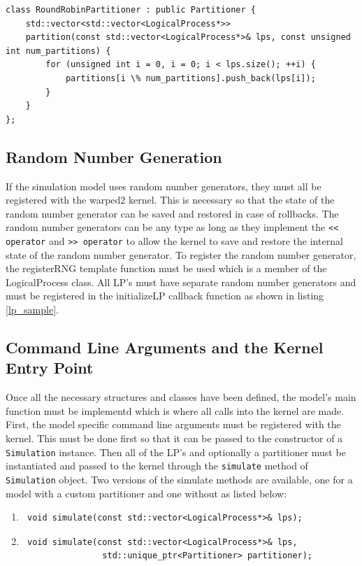 \documentclass[11pt]{book}
\begin{document}
\begin{lstlisting}[caption=Sample \textsc{warped2} Partitioner Definition, label=partitioner_sample, float]
class RoundRobinPartitioner : public Partitioner {
    std::vector<std::vector<LogicalProcess*>>
    partition(const std::vector<LogicalProcess*>& lps, const unsigned int num_partitions) {
        for (unsigned int i = 0, i = 0; i < lps.size(); ++i) {
            partitions[i \% num_partitions].push_back(lps[i]);
        }
    }
};
\end{lstlisting}

\subsection{Random Number Generation}

If the simulation model uses random number generators, they must all be registered with the warped2
kernel. This is necessary so that the state of the random number generator can be saved and restored
in case of rollbacks. The random number generators can be any type as long as they implement the
\texttt{<< operator} and \texttt{>> operator} to allow the kernel to save and restore the internal
state of the random number generator. To register the random number generator, the registerRNG
template function must be used which is a member of the LogicalProcess class. All LP's
must have separate random number generators and must be registered in the initializeLP callback
function as shown in listing \ref{lp_sample}.

\subsection{Command Line Arguments and the Kernel Entry Point}

Once all the necessary structures and classes have been defined, the model's main function must
be implementd which is where all calls into the kernel are made. First, the model specific command
line arguments must be registered with the kernel. This must be done first so that it can be passed
to the constructor of a \texttt{Simulation} instance. Then all of the LP's and optionally a
partitioner must be instantiated and passed to the kernel through the \texttt{simulate}
method of \texttt{Simulation} object. Two versions of the simulate methods are available, one for
a model with a custom partitioner and one without as listed below:

\begin{enumerate}

    \item \begin{verbatim} void simulate(const std::vector<LogicalProcess*>& lps); \end{verbatim}
    \item \begin{verbatim} void simulate(const std::vector<LogicalProcess*>& lps,
                std::unique_ptr<Partitioner> partitioner); \end{verbatim}

\end{enumerate}
\end{document}
